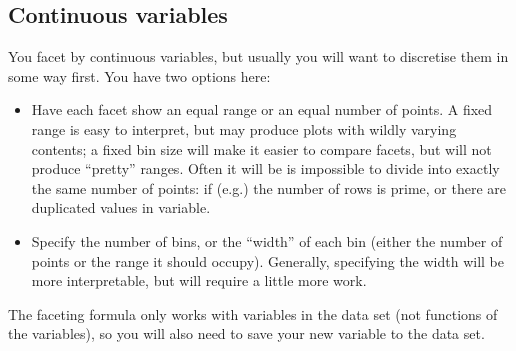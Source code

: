 % 


\subsection{Continuous variables}\label{sub:continuous_variables}

You facet by continuous variables, but usually you will want to discretise them in some way first.  You have two options here:

\begin{itemize}
  \item Have each facet show an equal range or an equal number of points.  A fixed range is easy to interpret, but may produce plots with wildly varying contents; a fixed bin size will make it easier to compare facets, but will not produce ``pretty'' ranges.  Often it will be is impossible to divide into exactly the same number of points: if (e.g.) the number of rows is prime, or there are duplicated values in variable.
    
  \item Specify the number of bins, or the ``width'' of each bin (either the number of points or the range it should occupy).  Generally, specifying the width will be more interpretable, but will require a little more work.
  
\end{itemize}

The faceting formula only works with variables in the data set (not functions of the variables), so you will also need to save your new variable to the data set.

% 
% 
% 
% 


